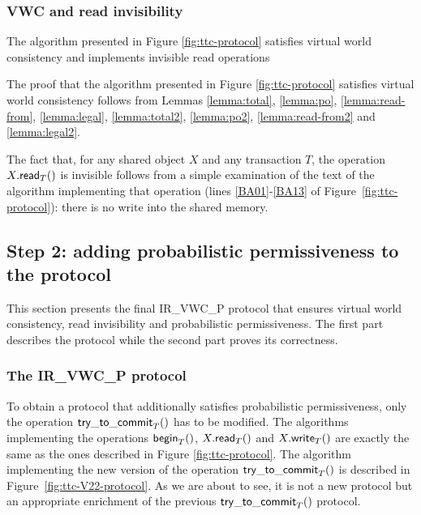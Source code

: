 \subsubsection{VWC and read invisibility}
\begin{theorem}
\label{theo:vwc}
The algorithm presented in Figure \ref{fig:ttc-protocol}
satisfies  virtual world consistency and implements invisible 
read operations

\end{theorem}
\begin{proofT}
The proof that the algorithm presented in Figure \ref{fig:ttc-protocol}
satisfies  virtual world consistency
 follows from Lemmas \ref{lemma:total}, \ref{lemma:po}, 
\ref{lemma:read-from}, \ref{lemma:legal},
\ref{lemma:total2}, \ref{lemma:po2}, \ref{lemma:read-from2} and 
\ref{lemma:legal2}.


The fact that, for any shared object $X$ and any transaction $T$, 
the  operation $X.{\sf read}_T()$ is invisible follows  from 
a simple examination of the  text of the algorithm implementing that 
operation (lines \ref{BA01}-\ref{BA13} of Figure~\ref{fig:ttc-protocol}): 
there is no write into the shared memory.
\renewcommand{\toto}{theo:vwc}
\end{proofT}






\subsection{Step 2: adding probabilistic permissiveness to the  protocol}
\label{sec:algorithm-V2} 
\label{sec:algo-V2-permissiveness}

This section  presents the final IR\_VWC\_P protocol that  ensures virtual
world  consistency, read  invisibility and   probabilistic permissiveness. 
The   first part describes  the protocol  while the  second part  proves 
its correctness. 



\subsubsection{The IR\_VWC\_P protocol}
To   obtain   a  protocol   that   additionally  satisfies    probabilistic
permissiveness,  only  the operation ${\sf try\_to\_commit}_T()$  has to be
modified.  
The algorithms implementing the operations ${\sf begin}_T()$, 
$X.{\sf read}_T()$ and  $X.{\sf write}_T()$  are exactly the same as  
the ones described in Figure \ref{fig:ttc-protocol}. 
The  algorithm implementing  the new version of the operation 
${\sf try\_to\_commit}_T()$ is described in Figure~\ref{fig:ttc-V22-protocol}. 
As we are about to see, it is not a new protocol but an appropriate
enrichment of the previous ${\sf try\_to\_commit}_T()$ protocol. 

